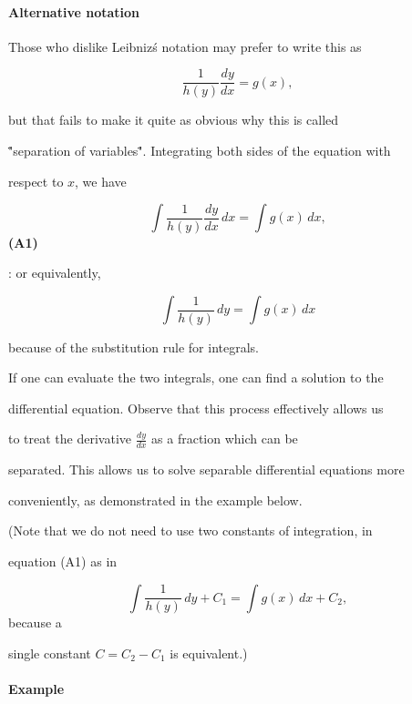 \paragraph{Alternative notation}



Those who dislike Leibniz\'s notation may prefer to write this as



$$\frac{1}{h(y)} \frac{dy}{dx} = g(x),$$



but that fails to make it quite as obvious why this is called

\""separation of variables\"". Integrating both sides of the equation with

respect to $x$, we have



$$\int \frac{1}{h(y)} \frac{dy}{dx} \, dx = \int g(x) \, dx,$$ \textbf{(A1)}



:   or equivalently,



$$\int \frac{1}{h(y)} \, dy = \int g(x) \, dx$$



because of the substitution rule for integrals.



If one can evaluate the two integrals, one can find a solution to the

differential equation. Observe that this process effectively allows us

to treat the derivative $\frac{dy}{dx}$ as a fraction which can be

separated. This allows us to solve separable differential equations more

conveniently, as demonstrated in the example below.



(Note that we do not need to use two constants of integration, in

equation (A1) as in



$$\int \frac{1}{h(y)} \, dy + C_1 = \int g(x) \, dx + C_2,$$ because a

single constant $C = C_2 - C_1$ is equivalent.)



\paragraph{Example}



